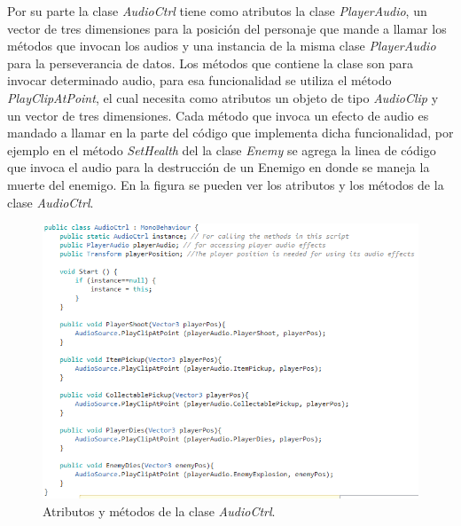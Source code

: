 Por su parte la clase \textit{AudioCtrl} tiene como atributos la clase 
\textit{PlayerAudio}, un vector de tres dimensiones para la posición del 
personaje que mande a llamar los métodos que invocan los audios y una instancia 
de la misma clase \textit{PlayerAudio} para la perseverancia de datos. Los 
métodos que contiene la clase son para invocar determinado audio, para esa 
funcionalidad se utiliza el método \textit{PlayClipAtPoint}, el cual necesita 
como atributos un objeto de tipo \textit{AudioClip} y un vector de tres 
dimensiones. Cada método que invoca un efecto de audio es mandado a llamar en la 
parte del código que implementa dicha funcionalidad, por ejemplo en el método 
\textit{SetHealth} del la clase \textit{Enemy} se agrega la linea de código que 
invoca el audio para la destrucción de un Enemigo en donde se maneja la muerte 
del enemigo. En la figura se pueden ver los atributos y los métodos de la clase 
\textit{AudioCtrl}.  

	\begin{figure}[h]
		\centering
		\includegraphics[height=0.3 \textheight]{03TrabajoRealizado/imagenes/audioCtrl.png}
		\caption{Atributos y métodos de la clase \textit{AudioCtrl}.}
		\label{fig:AudioCrl}
	\end{figure}

